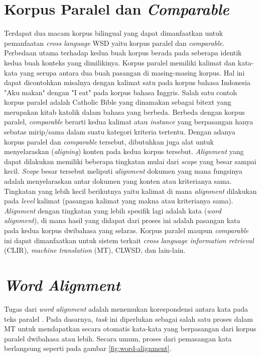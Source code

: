 \section{Korpus Paralel dan \textit{Comparable}}
Terdapat dua macam korpus bilingual yang dapat dimanfaatkan untuk pemanfaatan \textit{cross language } WSD yaitu korpus paralel dan \textit{comparable}. Perbedaan utama terhadap kedua buah korpus berada pada seberapa identik kedua buah konteks yang dimilikinya. Korpus paralel memiliki kalimat dan kata-kata yang serupa antara dua buah pasangan di masing-masing korpus. Hal ini dapat dicontohkan misalnya dengan kalimat satu pada korpus bahasa Indonesia "Aku makan" dengan "I eat" pada korpus bahasa Inggris. Salah satu contoh korpus paralel adalah Catholic Bible yang dinamakan sebagai bitext \citep{rudnick2011towards} yang merupakan kitab katolik dalam bahasa yang berbeda. Berbeda dengan korpus paralel, \textit{comparable} berarti kedua kalimat atau \textit{instance} yang berpasangan hanya sebatas mirip/sama dalam suatu kategori kriteria tertentu. Dengan adanya korpus paralel dan \textit{comparable} tersebut, dibutuhkan juga alat untuk menyelaraskan (\textit{aligning}) konten pada kedua korpus tersebut. \textit{Alignment} yang dapat dilakukan memiliki beberapa tingkatan mulai dari \textit{scope} yang besar sampai kecil. \textit{Scope} besar tersebut meliputi \textit{alignment} dokumen yang mana fungsinya adalah menyelaraskan antar dokumen yang konten atau kriterianya sama. Tingkatan yang lebih kecil berikutnya yaitu kalimat di mana \textit{alignment} dilakukan pada \textit{level} kalimat (pasangan kalimat yang makna atau kriterianya sama). \textit{Alignment} dengan tingkatan yang lebih spesifik lagi adalah kata (\textit{word alignment}), di mana hasil yang didapat dari proses ini adalah pasangan kata pada kedua korpus dwibahasa yang selaras. Korpus paralel maupun \textit{comparable} ini dapat dimanfaatkan untuk sistem terkait  \textit{cross language information retrieval} (CLIR), \textit{machine translation} (MT), CLWSD, dan lain-lain.
\section{\textit{Word Alignment}}
Tugas dari \textit{word alignment} adalah menemukan korespondensi antara kata pada teks paralel 
\citep{mihalcea2003evaluation}. Pada dasarnya, \textit{task} ini diperlukan sebagai salah satu proses dalam MT untuk mendapatkan secara otomatis kata-kata yang berpasangan dari korpus paralel dwibahasa atau lebih. Secara umum, proses dari pemasangan kata berlangsung seperti pada gambar \ref{fig:word-alignment}.


